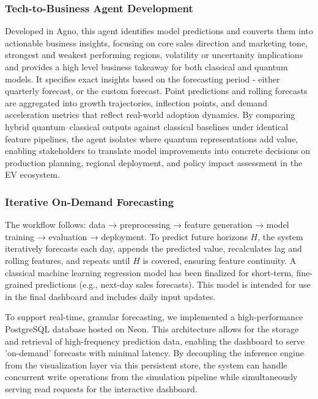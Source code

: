 \documentclass[pdflatex,sn-mathphys-num]{sn-jnl}%
\begin{document}
\subsubsection{Tech-to-Business Agent Development}

Developed in Agno, this agent identifies model predictions and converts them into actionable business insights, focusing on core sales direction and marketing tone, strongest and weakest performing regions, volatility or uncertanity implications and provides a high level business takeaway for both classical and quantum models. It specifies exact insights based on the forecasting period - either quarterly forecast, or the custom forecast. Point predictions and rolling forecasts are aggregated into growth trajectories, inflection points, and demand acceleration metrics that reflect real-world adoption dynamics. By comparing hybrid quantum–classical outputs against classical baselines under identical feature pipelines, the agent isolates where quantum representations add value, enabling stakeholders to translate model improvements into concrete decisions on production planning, regional deployment, and policy impact assessment in the EV ecosystem.

\subsubsection{Iterative On-Demand Forecasting}

The workflow follows: data → preprocessing → feature generation → model training → evaluation → deployment. To predict future horizons $H$, the system iteratively forecasts each day, appends the predicted value, recalculates lag and rolling features, and repeats until $H$ is covered, ensuring feature continuity. A classical machine learning regression model has been finalized for short-term, fine-grained predictions (e.g., next-day sales forecasts). This model is intended for use in the final dashboard and includes daily input updates.

To support real-time, granular forecasting, we implemented a high-performance PostgreSQL database hosted on Neon. This architecture allows for the storage and retrieval of high-frequency prediction data, enabling the dashboard to serve 'on-demand' forecasts with minimal latency. By decoupling the inference engine from the visualization layer via this persistent store, the system can handle concurrent write operations from the simulation pipeline while simultaneously serving read requests for the interactive dashboard.
\end{document}
